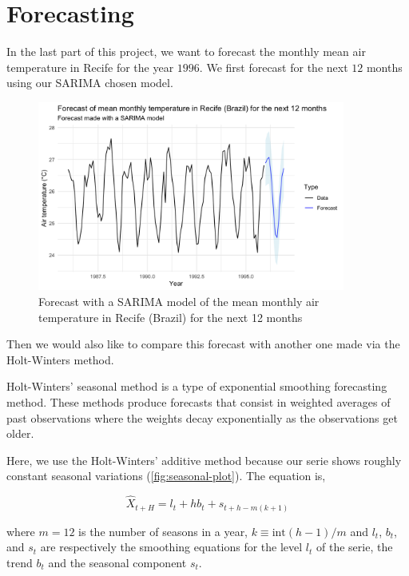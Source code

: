 \section{Forecasting}

In the last part of this project, we want to forecast the monthly mean air temperature in Recife for the year $1996$. We first forecast for the next $12$ months using our SARIMA chosen model.

\begin{figure}[H]
	\centering
	\includegraphics[width=0.9\textwidth]{figures/forecast/sarima_forecast.png}
	\caption{Forecast with a SARIMA model of the mean monthly air temperature in Recife (Brazil) for the next 12 months}
	\label{fig:sarima-forecast}
\end{figure}

Then we would also like to compare this forecast with another one made via the Holt-Winters method.

Holt-Winters' seasonal method is a type of exponential smoothing forecasting method. These methods produce forecasts that consist in weighted averages of past observations where the weights decay exponentially as the observations get older.

Here, we use the Holt-Winters' additive method because our serie shows roughly constant seasonal variations (\autoref{fig:seasonal-plot}). The equation is, 

\begin{equation}
	\hat{X}_{t + H} = l_t + h b_t + s_{t + h - m(k + 1)}
\end{equation}

where $m = 12$ is the number of seasons in a year, $k \equiv \text{int}(h - 1) / m$ and $l_t$, $b_t$, and $s_t$ are respectively the smoothing equations for the level $l_t$ of the serie, the trend $b_t$ and the seasonal component $s_t$.

